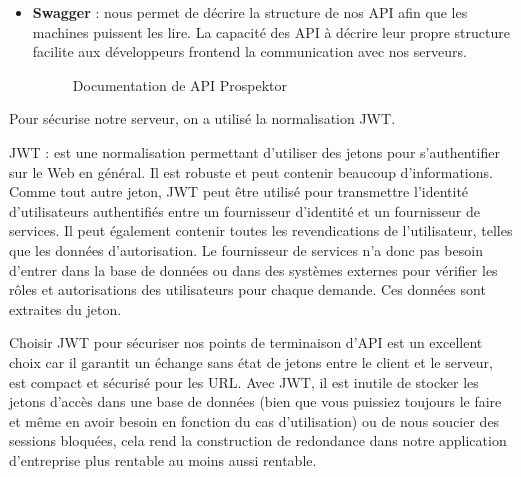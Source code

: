 \begin{itemize}
\begin{itemize}
\item Les d\'eveloppeurs adorent programmer avec Spring Boot. Ils sont plus productifs, b\'en\'eficient des avantages de l'\'ecosyst\`eme Spring et de la tranquillit\'e d'esprit des syst\`emes de production en fonctionnement.
\end{itemize}


\item \textbf{Swagger} : nous permet de d\'ecrire la structure de nos \gls{API} afin que les machines puissent les lire. La capacit\'e des \gls{API} \`a d\'ecrire leur propre structure facilite aux d\'eveloppeurs frontend la communication avec nos serveurs.

\begin{figure}[H]
	\caption{\label{fig:my-label} Documentation de \gls{API} Prospektor}
\end{figure}

\end{itemize}

Pour s\'ecurise notre serveur, on a utilis\'e la normalisation \gls{JWT}.

\gls{JWT} : est une normalisation permettant d'utiliser des jetons pour s'authentifier sur le Web en g\'en\'eral. Il est robuste et peut contenir beaucoup d'informations. Comme tout autre jeton, \gls{JWT} peut \^etre utilis\'e pour transmettre l'identit\'e d'utilisateurs authentifi\'es entre un fournisseur d'identit\'e et un fournisseur de services. Il peut \'egalement contenir toutes les revendications de l'utilisateur, telles que les donn\'ees d'autorisation. Le fournisseur de services n'a donc pas besoin d'entrer dans la base de donn\'ees ou dans des syst\`emes externes pour v\'erifier les r\^oles et autorisations des utilisateurs pour chaque demande. Ces donn\'ees sont extraites du jeton.

Choisir \gls{JWT} pour s\'ecuriser nos points de terminaison d'\gls{API} est un excellent choix car il garantit un \'echange sans \'etat de jetons entre le client et le serveur, est compact et s\'ecuris\'e pour les URL. Avec \gls{JWT}, il est inutile de stocker les jetons d'acc\`es dans une base de donn\'ees (bien que vous puissiez toujours le faire et m\^eme en avoir besoin en fonction du cas d'utilisation) ou de nous soucier des sessions bloqu\'ees, cela rend la construction de redondance dans notre application d'entreprise plus rentable au moins aussi rentable. 


